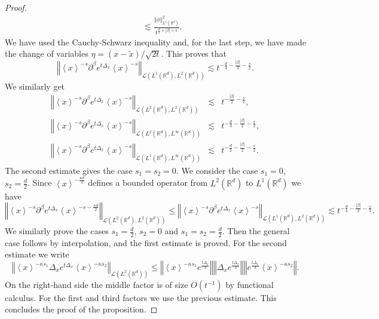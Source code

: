 \documentclass[10pt, a4paper,reqno]{amsart}
\theoremstyle{plain}
\theoremstyle{definition}
\theoremstyle{remark}
\begin{document}
\begin{proof}
\begin{eqnarray*}
&& \lesssim \frac {{\left\Vert {\phi}\right\Vert}_{L^1({\mathbb{R}}^d)}^2} {t^{\frac d 2 + {\left\vert {\beta}\right\vert} + s}}.
\end{eqnarray*}
We have used the Cauchy-Schwarz inequality and, for the last step, we have made the change of variables ${\eta} = (x- \tilde x)/ \sqrt{2t}$. This proves that 
\[
{\left\Vert {{\left< x \right>}^{-s} \partial^{\beta} e^{t{{\Delta}_x}} {\left< x \right>}^{-s}}\right\Vert}_{{{\mathcal L}}(L^1({\mathbb{R}}^d),L^2({\mathbb{R}}^d))} \lesssim t^{- \frac d 4 - \frac {{\left\vert {\beta}\right\vert}} 2 - \frac s 2}.
\]
We similarly get 
\begin{eqnarray*}
{\left\Vert {{\left< x \right>}^{-s} \partial^{\beta} e^{t{{\Delta}_x}} {\left< x \right>}^{-s}}\right\Vert}_{{{\mathcal L}}(L^2({\mathbb{R}}^d),L^2({\mathbb{R}}^d))} &\lesssim& t^{ - \frac {{\left\vert {\beta}\right\vert}} 2 - \frac s 2},\\
{\left\Vert {{\left< x \right>}^{-s} \partial^{\beta} e^{t{{\Delta}_x}} {\left< x \right>}^{-s}}\right\Vert}_{{{\mathcal L}}(L^2({\mathbb{R}}^d),L^\infty({\mathbb{R}}^d))} &\lesssim& t^{- \frac d 4 - \frac {{\left\vert {\beta}\right\vert}} 2 - \frac s 2},\\
{\left\Vert {{\left< x \right>}^{-s} \partial^{\beta} e^{t{{\Delta}_x}} {\left< x \right>}^{-s}}\right\Vert}_{{{\mathcal L}}(L^1({\mathbb{R}}^d),L^\infty({\mathbb{R}}^d))} &\lesssim& t^{- \frac d 2 - \frac {{\left\vert {\beta}\right\vert}} 2 - \frac s 2}.
\end{eqnarray*}
The second estimate gives the case $s_1 = s_2 = 0$. We consider the case $s_1 = 0$, $s_2 = \frac d 2$. Since ${\left< x \right>}^{-\frac {{\kappa} d}2}$ defines a bounded operator from $L^2({\mathbb{R}}^d)$ to $L^1({\mathbb{R}}^d)$ we have 
\begin{equation*}
{\left\Vert {{\left< x \right>}^{-s} \partial^{\beta} e^{t{{\Delta}_x}} {\left< x \right>}^{-s- \frac {{\kappa} d}2}}\right\Vert}_{{{\mathcal L}}(L^2({\mathbb{R}}^d),L^2({\mathbb{R}}^d))}
{\leqslant} {\left\Vert {{\left< x \right>}^{-s} \partial^{\beta} e^{t{{\Delta}_x}} {\left< x \right>}^{-s}}\right\Vert}_{{{\mathcal L}}(L^1({\mathbb{R}}^d),L^2({\mathbb{R}}^d))} \lesssim t^{- \frac d 4 - \frac {{\left\vert {\beta}\right\vert}} 2 - \frac s 2}.
\end{equation*}
We similarly prove the cases $s_1 = \frac d 2$, $s_2 = 0$ and $s_1 = s_2 = \frac d 2$. Then the general case follows by interpolation, and the first estimate is proved. For the second estimate we write 
\[
{\left\Vert {{\left< x \right>}^{-{\kappa} s_1} {{\Delta}_x} e^{t{{\Delta}_x}} {\left< x \right>}^{-{\kappa} s_2}}\right\Vert}_{{{\mathcal L}}(L^2({\mathbb{R}}^d))} {\leqslant} {\left\Vert {{\left< x \right>}^{-{\kappa} s_1} e^{\frac {t{{\Delta}_x}}3}}\right\Vert} {\left\Vert {{{\Delta}_x} e^{\frac {t{{\Delta}_x}} 3}}\right\Vert} {\left\Vert {e^{\frac {t{{\Delta}_x}}3} {\left< x \right>}^{-{\kappa} s_2}}\right\Vert}.
\]
On the right-hand side the middle factor is of size $O(t{^{-1}})$ by functional calculus. For the first and third factors we use the previous estimate. This concludes the proof of the proposition.
\end{proof}
\end{document}
